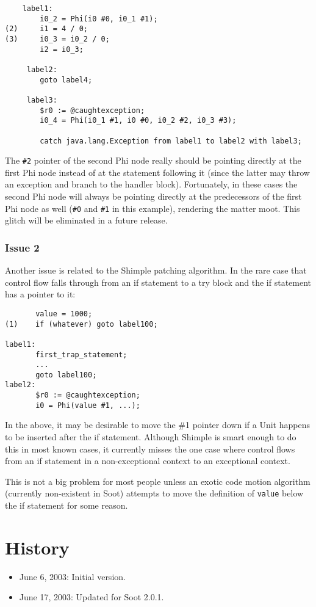 \documentclass[10pt,letterpaper,oneside,onecolumn]{article}
\begin{document}
\begin{verbatim}
    label1:
        i0_2 = Phi(i0 #0, i0_1 #1);
(2)     i1 = 4 / 0;
(3)     i0_3 = i0_2 / 0;
        i2 = i0_3;

     label2:
        goto label4;

     label3:
        $r0 := @caughtexception;
        i0_4 = Phi(i0_1 #1, i0 #0, i0_2 #2, i0_3 #3);

        catch java.lang.Exception from label1 to label2 with label3;
\end{verbatim}

The {\tt \#2} pointer of the second Phi node really should be pointing
directly at the first Phi node instead of at the statement following
it (since the latter may throw an exception and branch to the handler
block).  Fortunately, in these cases the second Phi node will always
be pointing directly at the predecessors of the first Phi node as well
({\tt \#0} and {\tt \#1} in this example), rendering the matter moot.
This glitch will be eliminated in a future release.

\subsubsection{Issue 2}

Another issue is related to the Shimple patching algorithm.  In the
rare case that control flow falls through from an if statement to a
try block and the if statement has a pointer to it:

\begin{verbatim}
       value = 1000;
(1)    if (whatever) goto label100;

label1:
       first_trap_statement;
       ...
       goto label100;
label2:
       $r0 := @caughtexception;
       i0 = Phi(value #1, ...);
\end{verbatim}

In the above, it may be desirable to move the \#1 pointer down if a
Unit happens to be inserted after the if statement.  Although Shimple
is smart enough to do this in most known cases, it currently misses
the one case where control flows from an if statement in a
non-exceptional context to an exceptional context.

This is not a big problem for most people unless an exotic code motion
algorithm (currently non-existent in Soot) attempts to move the
definition of {\tt value} below the if statement for some reason.

\section*{History}
\begin{itemize}
\item June 6, 2003: Initial version.
\item June 17, 2003: Updated for Soot 2.0.1.
\end{itemize}
\end{document}

